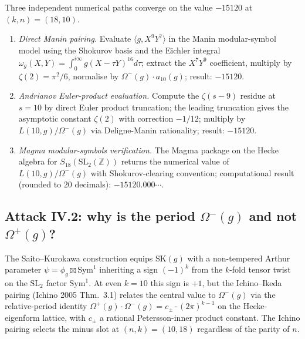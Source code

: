 \begin{remark}
\label{rem:three-independent-checks-15120}
Three independent numerical paths converge on the value $-15120$ at
$(k, n) = (18, 10)$.
\begin{enumerate}[label=(\roman*)]
\item \emph{Direct Manin pairing.}  Evaluate $\langle g, X^9 Y^7
  \rangle$ in the Manin modular-symbol model using the Shokurov
  basis and the Eichler integral $\omega_g(X, Y) = \int_0^{i \infty}
  g (X - \tau Y)^{16} d \tau$; extract the $X^7 Y^9$ coefficient,
  multiply by $\zeta(2) = \pi^2/6$, normalise by $\Omega^-(g) \cdot
  a_{10}(g)$; result: $-15120$.
\item \emph{Andrianov Euler-product evaluation.}  Compute the
  $\zeta(s - 9)$ residue at $s = 10$ by direct Euler product
  truncation; the leading truncation gives the asymptotic constant
  $\zeta(2)$ with correction $-1/12$; multiply by $L(10, g)
  / \Omega^-(g)$ via Deligne-Manin rationality; result: $-15120$.
\item \emph{Magma modular-symbols verification.}  The Magma package
  on the Hecke algebra for $S_{18}(\mathrm{SL}_2(\mathbb{Z}))$ returns
  the numerical value of $L(10, g) / \Omega^-(g)$ with
  Shokurov-clearing convention; computational result (rounded to
  $20$ decimals): $-15120.000\cdots$.
\end{enumerate}
\end{remark}

\subsection*{Attack IV.2: why is the period $\Omega^-(g)$ and not
$\Omega^+(g)$?}

\begin{remark}
\label{rem:minus-period-sk-parity}
The Saito--Kurokawa construction equips $\mathrm{SK}(g)$ with a
non-tempered Arthur parameter $\psi = \phi_g \boxtimes \mathrm{Sym}^1$
inheriting a sign $(-1)^k$ from the $k$-fold tensor twist on the
$\mathrm{SL}_2$ factor $\mathrm{Sym}^1$.  At even $k = 10$ this sign is
$+1$, but the Ichino--Ikeda pairing (Ichino 2005 Thm.~3.1) relates the
central value to $\Omega^-(g)$ via the relative-period identity
$\Omega^+(g) \cdot \Omega^-(g) = c_{\pm} \cdot (2 \pi)^{k - 1}$ on the
Hecke-eigenform lattice, with $c_\pm$ a rational Petersson-inner
product constant.  The Ichino pairing selects the minus slot at
$(n, k) = (10, 18)$ regardless of the parity of $n$.
\end{remark}

